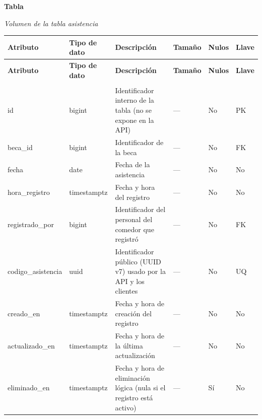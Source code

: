 \label{tab:volumen_asistencia}
\noindent\textbf{Tabla~\thetable}\par\nopagebreak
\noindent\textit{Volumen de la tabla asistencia}\par\nopagebreak
\begingroup\small\linespread{1}\selectfont\setlength{\tabcolsep}{4pt}
\begin{longtable}{>{\raggedright\arraybackslash}p{3.4cm} >{\raggedright\arraybackslash}p{2.5cm} >{\raggedright\arraybackslash}p{4.8cm} >{\centering\arraybackslash}p{1.6cm}>{\centering\arraybackslash}p{1.1cm} >{\centering\arraybackslash}p{1.3cm}}
\toprule
\textbf{Atributo} & \textbf{Tipo de dato} & \textbf{Descripción} & \textbf{Tamaño} & \textbf{Nulos} & \textbf{Llave} \\
\midrule
\endfirsthead
\toprule
\textbf{Atributo} & \textbf{Tipo de dato} & \textbf{Descripción} & \textbf{Tamaño} & \textbf{Nulos} & \textbf{Llave} \\
\midrule
\endhead
\endfoot
\bottomrule
\multicolumn{6}{l}{\textit{Nota.} Elaboración propia.} \\
\endlastfoot
id & bigint & Identificador interno de la tabla (no se expone en la API) & — & No & PK \\
beca\_\allowbreak{}id & bigint & Identificador de la beca & — & No & FK \\
fecha & date & Fecha de la asistencia & — & No & No \\
hora\_\allowbreak{}registro & timestamptz & Fecha y hora del registro & — & No & No \\
registrado\_\allowbreak{}por & bigint & Identificador del personal del comedor que registró & — & No & FK \\
codigo\_\allowbreak{}asistencia & uuid & Identificador público (UUID v7) usado por la API y los clientes & — & No & UQ \\
creado\_\allowbreak{}en & timestamptz & Fecha y hora de creación del registro & — & No & No \\
actualizado\_\allowbreak{}en & timestamptz & Fecha y hora de la última actualización & — & No & No \\
eliminado\_\allowbreak{}en & timestamptz & Fecha y hora de eliminación lógica (nula si el registro está activo) & — & Sí & No \\
\end{longtable}
\endgroup
\addtocounter{table}{-1}

